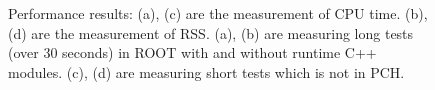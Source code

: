 \documentclass{webofc}
\begin{document}
\begin{figure}
\begin{minipage}{.48\textwidth}
 　 \end{minipage}\hfill
    \begin{minipage}{.48\textwidth}
 　 \end{minipage}
\caption{Performance results: (a), (c) are the measurement of CPU time. (b), (d) are the measurement of RSS. (a), (b) are measuring long tests (over 30 seconds) in ROOT with and without runtime C++ modules. (c), (d) are measuring short tests which is not in PCH.}
\label{fig:performance1}
\end{figure}
\end{document}
